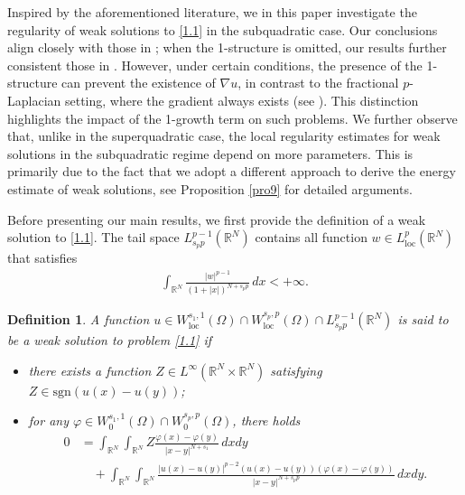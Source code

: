 \documentclass[reqno,10pt]{amsart}
\numberwithin{equation}{section}
\newtheorem{definition}[theorem]{Definition}
\begin{document}
Inspired by the aforementioned literature, we in this paper investigate the regularity of weak solutions to \eqref{1.1} in the subquadratic case. Our conclusions align closely with those in \cite{LZ25}; when the 1-structure is omitted, our results further consistent those in \cite{GL24}. However, under certain conditions,  the presence of the 1-structure can prevent the existence of $\nabla u$, in contrast to the fractional $p$-Laplacian setting, where the gradient always exists (see \cite{BDL2401}). This distinction highlights the impact of the 1-growth term on such problems. We further observe that, unlike in the superquadratic case, the local regularity estimates for weak solutions in the subquadratic regime depend on more parameters. This is primarily due to the fact that we adopt a different approach to derive the energy estimate of weak solutions, see Proposition \ref{pro9} for detailed arguments.



Before presenting our main results, we first provide the definition of a weak solution to \eqref{1.1}. The tail space $L^{p-1}_{s_pp}(\mathbb{R}^N)$ contains all function $w\in L^p_{\mathrm{loc}}(\mathbb{R}^N)$ that satisfies
\begin{align*}
	\int_{\mathbb{R}^N}\frac{|w|^{p-1}}{(1+|x|)^{N+s_pp}}\,dx<+\infty.
\end{align*}

\begin{definition}
	\label{def1}
	A function $u\in W^{s_1,1}_{\mathrm{loc}}(\Omega)\cap W^{s_p,p}_{\mathrm{loc}}(\Omega)\cap L^{p-1}_{s_pp}(\mathbb{R}^N)$ is said to be a weak solution to problem \eqref{1.1} if
	\begin{itemize}
		\item [(i)] there exists a function $Z\in L^\infty(\mathbb{R}^N\times\mathbb{R}^N)$ satisfying $Z\in \mathrm{sgn}(u(x)-u(y))$;
		\item [(ii)] for any $\varphi\in W^{s_1, 1}_{0}(\Omega)\cap W^{s_p, p}_{0}(\Omega)$, there holds
		\begin{align}
			\label{1.2}
			0&=\int_{\mathbb{R}^N}\int_{\mathbb{R}^N}Z\frac{\varphi(x)-\varphi(y)}{|x-y|^{N+s_1}}\,dxdy\nonumber\\
			&\quad+\int_{\mathbb{R}^N}\int_{\mathbb{R}^N}\frac{|u(x)-u(y)|^{p-2}(u(x)-u(y))(\varphi(x)-\varphi(y))}{|x-y|^{N+s_pp}}\,dxdy.
		\end{align}
	\end{itemize}
\end{definition}
\end{document}
